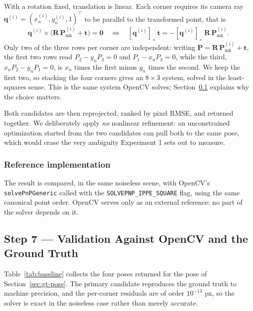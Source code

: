 \documentclass[11pt,a4paper]{article}
\theoremstyle{definition}
\theoremstyle{plain}
\theoremstyle{remark}
\newcommand{\code}[1]{\texttt{#1}}
\newcommand{\flag}{\texttt{SOLVEPNP\allowbreak\_IPPE\allowbreak\_SQUARE}}
\newcommand{\Pmark}{\mathbf{P}_{\text{mk}}}
\begin{document}
With a rotation fixed, translation is linear. Each corner requires its camera
ray $\mathbf{q}^{(i)} = (x_n^{(i)}, y_n^{(i)}, 1)^\top$ to be parallel to the
transformed point, that is
\begin{equation}
  \mathbf{q}^{(i)} \times \big(\mathbf{R}\,\Pmark^{(i)} + \mathbf{t}\big)
  = \mathbf{0}
  \quad\Longleftrightarrow\quad
  [\mathbf{q}^{(i)}]_\times\,\mathbf{t}
  = -[\mathbf{q}^{(i)}]_\times\,\mathbf{R}\,\Pmark^{(i)} .
  \label{eq:translation}
\end{equation}
Only two of the three rows per corner are independent: writing
$\mathbf{P}=\mathbf{R}\,\Pmark^{(i)}+\mathbf{t}$, the first two rows read
$P_2 - y_n P_3 = 0$ and $P_1 - x_n P_3 = 0$, while the third,
$x_n P_2 - y_n P_1 = 0$, is $x_n$ times the first minus $y_n$ times the second. We keep the first two, so stacking
the four corners gives an $8\times3$ system, solved in the least-squares sense.
This is the same system OpenCV solves; Section~\ref{sec:step7} explains why the
choice matters.

Both candidates are then reprojected, ranked by pixel RMSE, and returned
together. We deliberately apply \emph{no} nonlinear refinement: an
unconstrained optimization started from the two candidates can pull both to the
same pose, which would erase the very ambiguity Experiment 1 sets out to
measure.

\subsubsection{Reference implementation}

The result is compared, in the same noiseless scene, with OpenCV's
\code{solvePnPGeneric} called with the \flag{} flag, using the same canonical
point order. OpenCV serves only as an external reference: no part of the solver
depends on it.

\subsection{Step 7 --- Validation Against OpenCV and the Ground Truth}
\label{sec:step7}

Table~\ref{tab:baseline} collects the four poses returned for the pose of
Section~\ref{sec:gt-pose}. The primary candidate reproduces the ground truth to machine
precision, and the per-corner residuals are of order $10^{-13}$ px, so the
solver is exact in the noiseless case rather than merely accurate.
\end{document}
